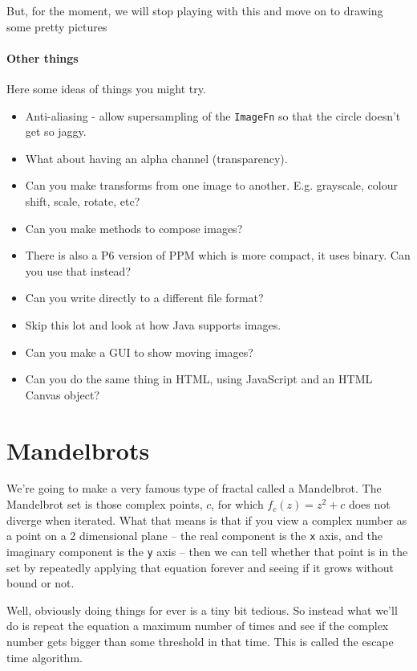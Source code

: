 \documentclass{article}
\begin{document}
            But, for the moment, we will stop playing with this and move on to drawing some pretty pictures 

        \newpage
        \paragraph{Other things}
            Here some ideas of things you might try.
            \begin{itemize}
                \item Anti-aliasing - allow supersampling of the \texttt{ImageFn} so that the circle doesn't get so jaggy.
                \item What about having an alpha channel (transparency).
                \item Can you make transforms from one image to another.  E.g. grayscale, colour shift, scale, rotate, etc?
                \item Can you make methods to compose images?
                \item There is also a P6 version of PPM which is more compact, it uses binary.  Can you use that instead?
                \item Can you write directly to a different file format?
                \item Skip this lot and look at how Java supports images.
                \item Can you make a GUI to show moving images?
                \item Can you do the same thing in HTML, using JavaScript and an HTML Canvas object?
            \end{itemize}

    \newpage
    \section{Mandelbrots}

        We're going to make a very famous type of fractal called a Mandelbrot. The Mandelbrot set is those complex points, $c$, for which
        $f_c(z)=z^2+c$ does not diverge when iterated. What that means is that if you view a complex number as a point on a 2 dimensional
        plane -- the real component is the \texttt{x} axis, and the imaginary component is the \texttt{y} axis -- then we can tell whether
        that point is in the set by repeatedly applying that equation forever and seeing if it grows without bound or not.
        
        Well, obviously doing things for ever is a tiny bit tedious. So instead what we'll do is repeat the equation a maximum number of
        times and see if the complex number gets bigger than some threshold in that time.  This is called the escape time algorithm.
        
\end{document}
